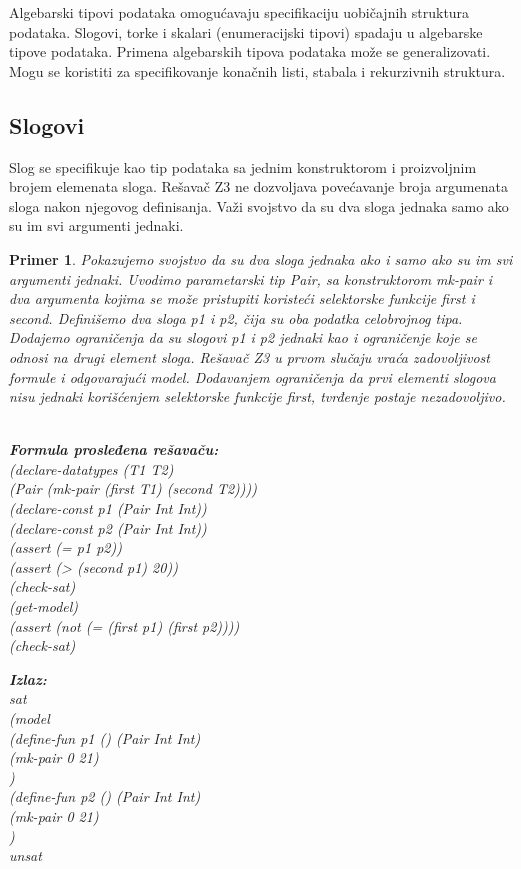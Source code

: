 \documentclass[12pt,oneside]{memoir}
\newcommand\tab[1][0.5cm]{\hspace*{#1}}
\newtheorem{primer}{Primer}
\begin{document}
Algebarski tipovi podataka omogućavaju specifikaciju uobičajnih struktura podataka. Slogovi, torke i skalari (enumeracijski tipovi) spadaju u algebarske tipove podataka. Primena algebarskih tipova podataka može se generalizovati. Mogu se koristiti za specifikovanje konačnih listi, stabala i rekurzivnih struktura. 
\subsection{Slogovi}
Slog se specifikuje kao tip podataka sa jednim konstruktorom i proizvoljnim brojem elemenata sloga. Rešavač Z3 ne dozvoljava povećavanje broja argumenata sloga nakon njegovog definisanja. Važi svojstvo da su dva sloga jednaka samo ako su im svi argumenti jednaki.

\begin{primer} Pokazujemo svojstvo da su dva sloga jednaka ako i samo ako su im svi argumenti jednaki. Uvodimo parametarski tip Pair, sa konstruktorom mk-pair i dva argumenta kojima se može pristupiti koristeći selektorske funkcije first i second. Definišemo dva sloga p1 i p2, čija su oba podatka celobrojnog tipa. Dodajemo ograničenja da su slogovi p1 i p2 jednaki kao i ograničenje koje se odnosi na drugi element sloga. Rešavač Z3 u prvom slučaju vraća zadovoljivost formule i odgovarajući model. Dodavanjem ograničenja da prvi elementi slogova nisu jednaki korišćenjem selektorske funkcije first, tvrđenje postaje nezadovoljivo.
\\ \\
\begin{minipage}[b]{0.5\textwidth}
\textbf{Formula prosleđena rešavaču:}
\\(declare-datatypes (T1 T2) 
\\\tab[0.3cm](Pair (mk-pair (first T1) (second T2))))
\\(declare-const p1 (Pair Int Int))
\\(declare-const p2 (Pair Int Int))
\\(assert (= p1 p2))
\\(assert (> (second p1) 20))
\\(check-sat)
\\(get-model)
\\(assert (not (= (first p1) (first p2))))
\\(check-sat)
\end{minipage}
\hspace{1.5cm} 
\begin{minipage}[t]{0.5\textwidth}
\vspace{-6.59cm}
\textbf{Izlaz:}
\\sat 
\\(model 
\\\tab(define-fun p1 () (Pair Int Int) 
\\\tab\tab(mk-pair 0 21)
\\\tab) 
\\\tab(define-fun p2 () (Pair Int Int) 
\\\tab\tab(mk-pair 0 21)
\\\tab)
\\unsat
\end{minipage}

\end{primer}
\end{document}
